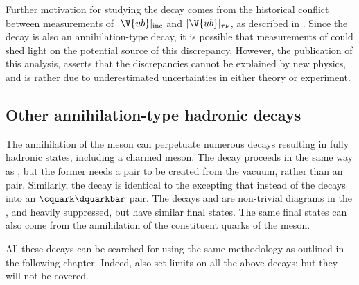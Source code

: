 Further motivation for studying the decay \btodsphi comes from the
historical conflict between measurements of
$|\V{ub}|_\mathrm{inc}$ and $|\V{ub}|_{\tau\nu}$, as described in .
Since the decay \decay{\Bp}{\taup\nu_\tau} is also an annihilation-type decay, it is possible that
measurements of \btodsphi could shed light on the potential source of this discrepancy.
However, the publication of this analysis,  asserts that the
discrepancies cannot be explained by new physics, and is rather due to underestimated uncertainties in
either theory or experiment.








\subsection{Other annihilation-type hadronic decays}
The annihilation of the \Bp meson can perpetuate numerous decays resulting in fully hadronic
states, including a charmed meson.
The decay \decay{\Bp}{\Dp\Kstarz} proceeds in the same way as
\btodsphi, but the former needs a \ddbar pair to be created from the \QCD vacuum, rather than an
\ssbar pair.
Similarly, the decay \decay{\Bp}{\Ds\Kstarzb} is identical to the \btodsphi excepting that instead
of \decay{\Wp}{\cquark\squarkbar} the \Wp decays into an $\cquark\dquarkbar$ pair.
The decays \decay{\Bp}{\Dp\Kstarzb} and \decay{\Bp}{\Ds\Kstarz} are non-trivial diagrams in the
\sm, and heavily suppressed, but have similar final states.
The same final states can also come from the annihilation of the constituent
quarks of the \Bc meson.

All these decays can be searched for using the same methodology as outlined in the following
chapter.
Indeed,  also set limits on all the above decays; but they will not be
covered.

































